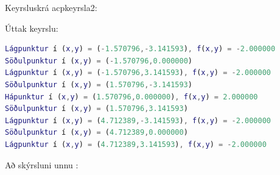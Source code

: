 \documentclass[a4]{article}
\begin{document}
\newpage
Keyrsluskrá acpkeyrsla2:


Úttak keyrslu:
\begin{lstlisting}[language=Matlab]
Lágpunktur í (x,y) = (-1.570796,-3.141593), f(x,y) = -2.000000
Söðulpunktur í (x,y) = (-1.570796,0.000000)
Lágpunktur í (x,y) = (-1.570796,3.141593), f(x,y) = -2.000000
Söðulpunktur í (x,y) = (1.570796,-3.141593)
Hápunktur í (x,y) = (1.570796,0.000000), f(x,y) = 2.000000
Söðulpunktur í (x,y) = (1.570796,3.141593)
Lágpunktur í (x,y) = (4.712389,-3.141593), f(x,y) = -2.000000
Söðulpunktur í (x,y) = (4.712389,0.000000)
Lágpunktur í (x,y) = (4.712389,3.141593), f(x,y) = -2.000000
\end{lstlisting}


\vspace{20 mm}
Að skýrsluni unnu :
\hspace{0.5cm} \makebox[1.5in]{\hrulefill}
\hspace{0.5cm} \makebox[1.5in]{\hrulefill}
\hspace{0.5cm} \makebox[1.5in]{\hrulefill}
\end{document}
